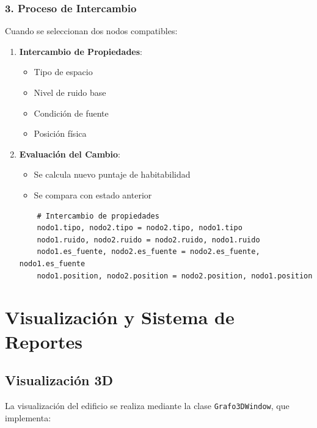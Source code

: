 \documentclass[a4paper,12pt]{article}
\begin{document}
\subsubsection{3. Proceso de Intercambio}
Cuando se seleccionan dos nodos compatibles:
\begin{enumerate}
    \item \textbf{Intercambio de Propiedades}:
    \begin{itemize}
        \item Tipo de espacio
        \item Nivel de ruido base
        \item Condición de fuente
        \item Posición física
    \end{itemize}
    
    \item \textbf{Evaluación del Cambio}:
    \begin{itemize}
        \item Se calcula nuevo puntaje de habitabilidad
        \item Se compara con estado anterior
    \end{itemize}
    
    \lstset{language=Python}
    \begin{lstlisting}
    # Intercambio de propiedades
    nodo1.tipo, nodo2.tipo = nodo2.tipo, nodo1.tipo
    nodo1.ruido, nodo2.ruido = nodo2.ruido, nodo1.ruido
    nodo1.es_fuente, nodo2.es_fuente = nodo2.es_fuente, nodo1.es_fuente
    nodo1.position, nodo2.position = nodo2.position, nodo1.position
    \end{lstlisting}
\end{enumerate}

\section{Visualización y Sistema de Reportes}
\subsection{Visualización 3D}
La visualización del edificio se realiza mediante la clase \texttt{Grafo3DWindow}, que implementa:
\end{document}

